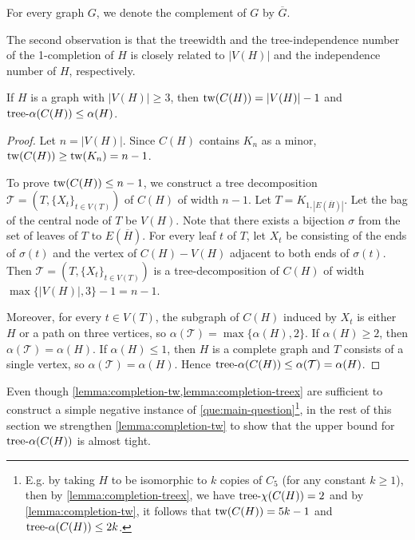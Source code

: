 \documentclass[a4paper, cleveref, autoref, thm-restate]{lipics-v2021}
\newcommand{\T}{\mathcal{T}}
\newcommand{\tw}{{\rm tw}}
\newcommand{\treea}{{\rm tree}\textnormal{-}\alpha}
\newcommand{\treex}{{\rm tree}\textnormal{-}\chi}
\begin{document}
For every graph $G$, we denote the complement of $G$ by $\overline{G}$.

The second observation is that the treewidth and the tree-independence number of the 1-completion of $H$ is closely related to $|V(H)|$ and the independence number of $H$, respectively.

\begin{lemma}\label{lemma:completion-tw}
    If $H$ is a graph with $|V(H)| \geq 3$, then $\tw(C(H)) = |V(H)|-1$ and $\treea(C(H)) \leq \alpha(H)$.
\end{lemma}
% 
\begin{proof}
    Let $n=|V(H)|$.
    Since $C(H)$ contains $K_n$ as a minor, $\tw(C(H)) \geq \tw(K_n) = n-1$. %
    
    To prove $\tw(C(H)) \leq n-1$, we construct a tree decomposition $\T = (T,\{X_t\}_{t\in V(T)})$ of $C(H)$ of width $n-1$. 
    Let $T=K_{1,|E(\overline H)|}$.
    Let the bag of the central node of $T$ be $V(H)$. 
    Note that there exists a bijection $\sigma$ from the set of leaves of $T$ to $E(\overline{H})$.
    For every leaf $t$ of $T$, let $X_t$ be consisting of the ends of $\sigma(t)$ and the vertex of $C(H)-V(H)$ adjacent to both ends of $\sigma(t)$.
    Then $\T = (T,\{X_t\}_{t\in V(T)})$ is a tree-decomposition of $C(H)$ of width $\max\{|V(H)|,3\}-1 = n-1$. 

    Moreover, for every $t \in V(T)$, the subgraph of $C(H)$ induced by $X_t$ is either $H$ or a path on three vertices, so $\alpha(\T) = \max\{\alpha(H),2\}$.
    If $\alpha(H) \geq 2$, then $\alpha(\T) = \alpha(H)$.
    If $\alpha(H) \leq 1$, then $H$ is a complete graph and $T$ consists of a single vertex, so $\alpha(\T)=\alpha(H)$.
    Hence $\treea(C(H)) \leq \alpha(\T) = \alpha(H)$.
\end{proof}

Even though \cref{lemma:completion-tw,lemma:completion-treex} are sufficient to construct a simple negative instance of \cref{que:main-question}\footnote{E.g. by taking $H$ to be isomorphic to $k$ copies of $C_5$ (for any constant $k\ge 1$), then by \cref{lemma:completion-treex}, we have $\treex(C(H)) = 2$ and by \cref{lemma:completion-tw}, it follows that $\tw(C(H)) = 5k-1$ and $\treea(C(H))\le 2k$.}, in the rest of this section we strengthen \cref{lemma:completion-tw} to show that the upper bound for $\treea(C(H))$ is almost tight.
\end{document}
